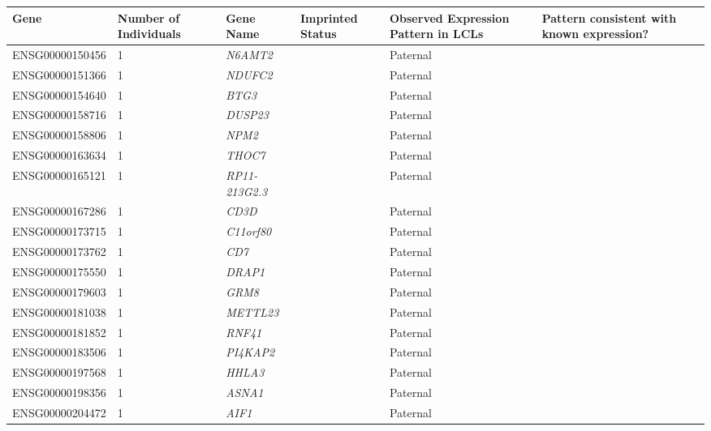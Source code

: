 \begin{table}
\centering
\begin{adjustbox}{width={\textwidth}}
\begin{tabular}{@{}p{4cm}p{3cm}p{3cm}p{3cm}p{3cm}p{3cm}@{}}
\toprule Gene & 	Number of \newline Individuals & 	Gene Name&	Imprinted \newline Status	&Observed \newline Expression \newline Pattern \newline in LCLs	&Pattern \newline consistent with \newline known \newline expression? \\ \midrule
ENSG00000150456 & 1 & \emph{N6AMT2} & & Paternal &   \\ \hline
ENSG00000151366 & 1 & \emph{NDUFC2}& & Paternal &   \\ \hline
ENSG00000154640 & 1 & \emph{BTG3} & &  Paternal &   \\ \hline
ENSG00000158716 & 1 & \emph{DUSP23} & &  Paternal &   \\ \hline
ENSG00000158806 & 1 & \emph{NPM2} & &  Paternal &   \\ \hline
ENSG00000163634 & 1 & \emph{THOC7} & &  Paternal &   \\ \hline
ENSG00000165121 & 1 & \emph{RP11-213G2.3} & &  Paternal &  \\ \hline
ENSG00000167286 & 1 & \emph{CD3D} & & Paternal &   \\ \hline
ENSG00000173715 & 1 & \emph{C11orf80} & & Paternal &   \\ \hline
ENSG00000173762 & 1 & \emph{CD7} & &  Paternal &   \\ \hline
ENSG00000175550 & 1 & \emph{DRAP1} & &  Paternal &   \\ \hline
ENSG00000179603 & 1 & \emph{GRM8} & &  Paternal &   \\ \hline
ENSG00000181038 & 1 & \emph{METTL23} & &  Paternal &   \\ \hline
ENSG00000181852 & 1 & \emph{RNF41} & &  Paternal &   \\ \hline
ENSG00000183506 & 1 & \emph{PI4KAP2} & & Paternal &   \\ \hline
ENSG00000197568 & 1 & \emph{HHLA3} & &  Paternal &   \\ \hline
ENSG00000198356 & 1 & \emph{ASNA1} & &  Paternal &   \\ \hline
ENSG00000204472 & 1 & \emph{AIF1} & &  Paternal &   \\ \hline

\end{tabular}
\end{adjustbox}
\end{table}
